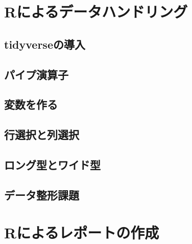 \documentclass[
  a4paper,
]{ltjsbook}
\begin{document}

\hypertarget{rux306bux3088ux308bux30c7ux30fcux30bfux30cfux30f3ux30c9ux30eaux30f3ux30b0}{%
\chapter{Rによるデータハンドリング}\label{rux306bux3088ux308bux30c7ux30fcux30bfux30cfux30f3ux30c9ux30eaux30f3ux30b0}}

\hypertarget{tidyverseux306eux5c0eux5165}{%
\section{tidyverseの導入}\label{tidyverseux306eux5c0eux5165}}

\hypertarget{ux30d1ux30a4ux30d7ux6f14ux7b97ux5b50}{%
\section{パイプ演算子}\label{ux30d1ux30a4ux30d7ux6f14ux7b97ux5b50}}

\hypertarget{ux5909ux6570ux3092ux4f5cux308b}{%
\section{変数を作る}\label{ux5909ux6570ux3092ux4f5cux308b}}

\hypertarget{ux884cux9078ux629eux3068ux5217ux9078ux629e}{%
\section{行選択と列選択}\label{ux884cux9078ux629eux3068ux5217ux9078ux629e}}

\hypertarget{ux30edux30f3ux30b0ux578bux3068ux30efux30a4ux30c9ux578b}{%
\section{ロング型とワイド型}\label{ux30edux30f3ux30b0ux578bux3068ux30efux30a4ux30c9ux578b}}

\hypertarget{ux30c7ux30fcux30bfux6574ux5f62ux8ab2ux984c}{%
\section{データ整形課題}\label{ux30c7ux30fcux30bfux6574ux5f62ux8ab2ux984c}}


\hypertarget{rux306bux3088ux308bux30ecux30ddux30fcux30c8ux306eux4f5cux6210}{%
\chapter{Rによるレポートの作成}\label{rux306bux3088ux308bux30ecux30ddux30fcux30c8ux306eux4f5cux6210}}
\end{document}
